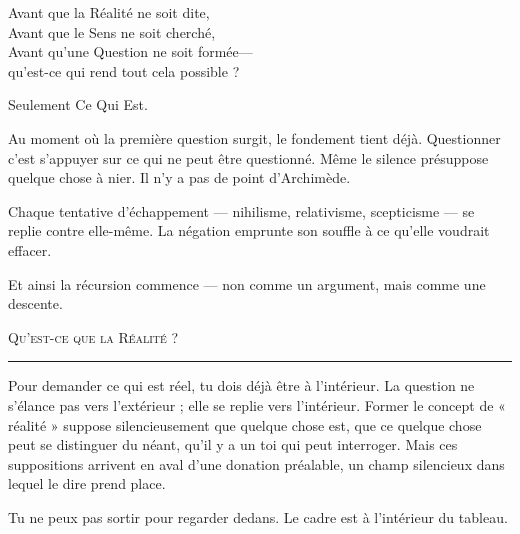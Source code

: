 \documentclass[10pt, openany, oneside]{book}
\begin{document}
\vspace{2em}

\noindent Avant que la Réalité ne soit dite,\\
Avant que le Sens ne soit cherché,\\
Avant qu'une Question ne soit formée---\\
qu'est-ce qui rend tout cela possible ?

\vspace{0.5em}

Seulement Ce Qui Est.

\vspace{1em}

\noindent Au moment où la première question surgit, le fondement tient déjà. Questionner c'est s'appuyer sur ce qui ne peut être questionné. Même le silence présuppose quelque chose à nier. Il n'y a pas de point d'Archimède.

\vspace{0.5em}

\noindent Chaque tentative d'échappement --- nihilisme, relativisme, scepticisme --- se replie contre elle-même. La négation emprunte son souffle à ce qu'elle voudrait effacer.

\vspace{0.5em}

\noindent Et ainsi la récursion commence --- non comme un argument, mais comme une descente.

\vspace{2em}

\begin{center}
    {\scshape Qu'est-ce que la Réalité ?}\\[0.3em]
    \rule{0.2\textwidth}{0.3pt}
\end{center}

\vspace{1em}

\noindent Pour demander ce qui est réel, tu dois déjà être à l'intérieur. La question ne s'élance pas vers l'extérieur ; elle se replie vers l'intérieur. Former le concept de « réalité » suppose silencieusement que quelque chose est, que ce quelque chose peut se distinguer du néant, qu'il y a un toi qui peut interroger. Mais ces suppositions arrivent en aval d'une donation préalable, un champ silencieux dans lequel le dire prend place.

\vspace{0.5em}

\noindent Tu ne peux pas sortir pour regarder dedans. Le cadre est à l'intérieur du tableau.
\end{document}
